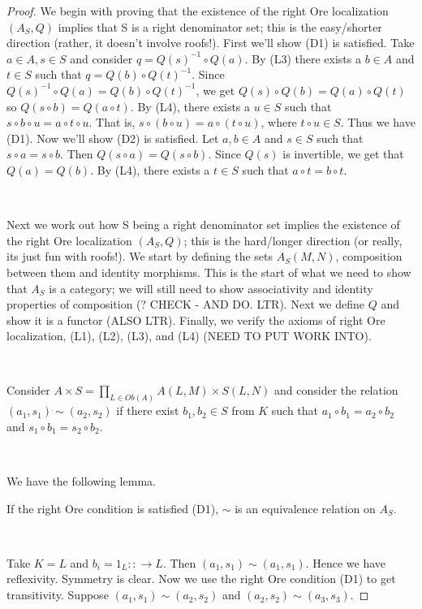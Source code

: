 \documentclass[12pt]{amsart}    %
\theoremstyle{definition}
\begin{document}
\begin{proof}

We begin with proving that the existence of the right Ore localization $(A_S, Q)$ implies that S is a right denominator set; this is the easy/shorter direction (rather, it doesn't involve roofs!).  First we'll show (D1) is satisfied.  Take $a \in A, s \in S$ and consider $q = Q(s)^{-1}\circ Q(a)$.  By (L3) there exists a $b \in A$ and $t \in S$ such that $q = Q(b) \circ Q(t)^{-1}$.  Since $Q(s)^{-1}\circ Q(a) = Q(b) \circ Q(t)^{-1}$, we get $Q(s) \circ Q(b) = Q(a) \circ Q(t)$ so $Q(s \circ b) = Q(a \circ t)$.  By (L4), there exists a $u \in S$ such that $s \circ b \circ u = a \circ t \circ u$.  That is, $s \circ (b \circ u) = a \circ (t \circ u)$, where $t \circ u \in S$.  Thus we have (D1).  Now we'll show (D2) is satisfied.  Let $a, b \in A$ and $s \in S$ such that $s \circ a = s \circ b$.  Then $Q(s\circ a) = Q(s \circ b)$.  Since $Q(s)$ is invertible, we get that $Q(a) = Q(b)$.  By (L4), there exists a $t \in S$ such that $a \circ t = b \circ t$.

\

Next we work out how S being a right denominator set implies the existence of the right Ore localization $(A_S, Q)$; this is the hard/longer direction (or really, its just fun with roofs!).  We start by defining the sets $A_S(M,N)$, composition between them and identity morphisms.  This is the start of what we need to show that $A_S$ is a category; we will still need to show associativity and identity properties of composition (? CHECK - AND DO. LTR).  Next we define $Q$ and show it is a functor (ALSO LTR).  Finally, we verify the axioms of right Ore localization, (L1), (L2), (L3), and (L4) (NEED TO PUT WORK INTO).   

\

Consider $A \times S = \prod _{L \in Ob(A)} A(L,M) \times S(L,N)$ and consider the relation $(a_1, s_1) \sim (a_2, s_2)$ if there exist $b_1, b_2 \in S$ from $K$ such that $a_1 \circ b_1 = a_2 \circ b_2$ and $s_1 \circ b_1 = s_2 \circ b_2$.  

\


We have the following lemma.

If the right Ore condition is satisfied (D1), $\sim$ is an equivalence relation on $A_S$.

\

Take $K = L$ and $b_i = 1_L: : \rightarrow L$.  Then $(a_1, s_1) \sim (a_1,s_1)$.  Hence we have reflexivity.  Symmetry is clear.  Now we use the right Ore condition (D1) to get transitivity.  Suppose $(a_1, s_1) \sim (a_2, s_2)$ and $(a_2, s_2) \sim (a_3, s_3)$.


\end{proof}
\end{document}
